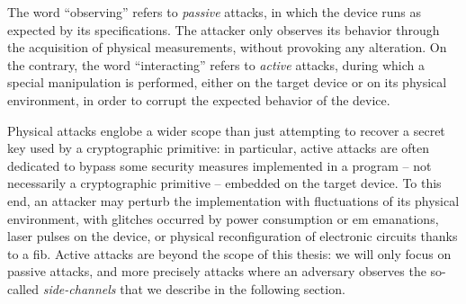 \label{ref_passive_active}
The word ``observing'' refers to \emph{passive} attacks, in which the device runs as expected by its specifications.
The attacker only observes its behavior through the acquisition of physical measurements, without provoking any alteration.
On the contrary, the word ``interacting'' refers to \emph{active} attacks, during which a special manipulation is performed, either on the target device or on its physical environment, in order to corrupt the expected behavior of the device.

Physical attacks englobe a wider scope than just attempting to recover a secret key used by a cryptographic primitive: in particular, active attacks are often dedicated to bypass some security measures implemented in a program -- not necessarily a cryptographic primitive -- embedded on the target device.
To this end, an attacker may perturb the implementation with fluctuations of its physical environment, \eg{} with glitches occurred by power consumption or \gls{em} emanations, laser pulses on the device, or physical reconfiguration of electronic circuits thanks to a \gls{fib}.
Active attacks are beyond the scope of this thesis: we will only focus on passive attacks, and more precisely attacks where an adversary observes the so-called \emph{side-channels} that we describe in the following section.


